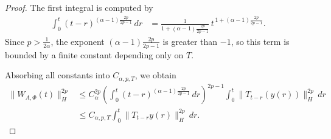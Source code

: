 \documentclass[11pt]{article}
\theoremstyle{definition}
\theoremstyle{remark}
\begin{document}
\begin{proof}
The first integral is computed by
\begin{align*}
\int_0^t (t-r)^{(\alpha-1)\frac{2p}{2p-1}}\,dr
&=
\frac{1}{1+(\alpha-1)\frac{2p}{2p-1}}\,t^{\,1+(\alpha-1)\frac{2p}{2p-1}}.
\end{align*}
Since \(p>\frac{1}{2\alpha}\), the exponent \((\alpha-1)\frac{2p}{2p-1}\) is greater than \(-1\), so this term is bounded by a finite constant depending only on \(T\).

Absorbing all constants into \(C_{\alpha,p,T}\), we obtain
\begin{align*}
\|W_{A,\Phi}(t)\|_H^{2p}
&\le
C_\alpha^{2p}
\left(\int_0^t (t-r)^{(\alpha-1)\frac{2p}{2p-1}}\,dr\right)^{2p-1}
\int_0^t \|T_{t-r}(y(r))\|_H^{2p}\,dr \\
&\le
C_{\alpha,p,T}\int_0^t \|T_{t-r}y(r)\|_H^{2p}\,dr.
\end{align*}

\medskip


\end{proof}
\end{document}

